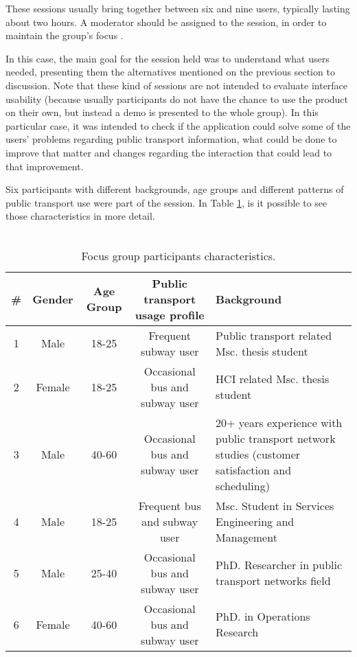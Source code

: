 These sessions usually bring together between six and nine users, typically lasting about two hours. A moderator should be assigned to the session, in order to maintain the group's focus \cite{kn:Nie97}. 

In this case, the main goal for the session held was to understand what users needed, presenting them the alternatives mentioned on the previous section to discussion. Note that these kind of sessions are not intended to evaluate interface usability (because usually participants do not have the chance to use the product on their own, but instead a demo is presented to the whole group). In this particular case, it was intended to check if the application could solve some of the users' problems regarding public transport information, what could be done to improve that matter and changes regarding the interaction that could lead to that improvement.

Six participants with different backgrounds, age groups and different patterns of public transport use were part of the session. In Table \ref{tab:table1}, is it possible to see those characteristics in more detail. \\ \\



\begin{table}[H]

\begin{center}
\begin{tabular}{ c c c c p{5cm} }

  \hline 
  \textbf{\#} & \textbf{Gender} & \textbf{Age Group} & \textbf{Public transport usage profile} & \textbf{Background} \\
  \hline 
  1 & Male & 18-25 & Frequent subway user & Public transport related Msc. thesis
   student \\
  \hline
  2 & Female & 18-25 & Occasional bus and subway user & HCI related Msc. thesis student \\
  \hline
  3 & Male & 40-60 & Occasional bus and subway user & 20+ years experience with public transport
  network studies (customer satisfaction
   and scheduling) \\ 
  \hline
  4 & Male & 18-25 & Frequent bus and subway user & Msc. Student in Services Engineering
   and Management\\
  \hline
  5 & Male & 25-40 & Occasional bus and subway user & PhD. Researcher in public transport
   networks field\\
  \hline
  6 & Female & 40-60 & Occasional bus and subway user & PhD. in Operations Research\\
  \hline
\end{tabular}
\caption{Focus group participants characteristics.}
\label{tab:table1}
\end{center}
\end{table}

